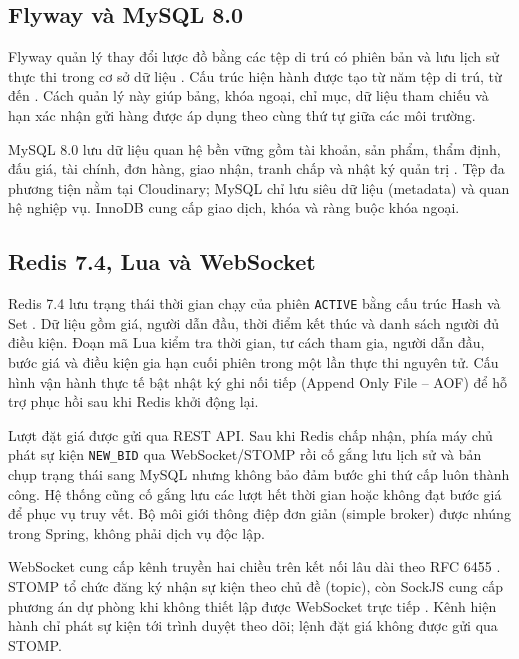 \documentclass[../DoAn.tex]{subfiles}
\begin{document}
\subsection{Flyway và MySQL 8.0}

Flyway quản lý thay đổi lược đồ bằng các tệp di trú có phiên bản và lưu lịch sử thực thi trong cơ sở dữ liệu \cite{flywaydocs}. Cấu trúc hiện hành được tạo từ năm tệp di trú, từ  đến . Cách quản lý này giúp bảng, khóa ngoại, chỉ mục, dữ liệu tham chiếu và hạn xác nhận gửi hàng được áp dụng theo cùng thứ tự giữa các môi trường.

MySQL 8.0 lưu dữ liệu quan hệ bền vững gồm tài khoản, sản phẩm, thẩm định, đấu giá, tài chính, đơn hàng, giao nhận, tranh chấp và nhật ký quản trị \cite{mysqldocs}. Tệp đa phương tiện nằm tại Cloudinary; MySQL chỉ lưu siêu dữ liệu (metadata) và quan hệ nghiệp vụ. InnoDB cung cấp giao dịch, khóa và ràng buộc khóa ngoại.

\subsection{Redis 7.4, Lua và WebSocket}

Redis 7.4 lưu trạng thái thời gian chạy của phiên \texttt{ACTIVE} bằng cấu trúc Hash và Set \cite{redisdocs}. Dữ liệu gồm giá, người dẫn đầu, thời điểm kết thúc và danh sách người đủ điều kiện. Đoạn mã Lua kiểm tra thời gian, tư cách tham gia, người dẫn đầu, bước giá và điều kiện gia hạn cuối phiên trong một lần thực thi nguyên tử. Cấu hình vận hành thực tế bật nhật ký ghi nối tiếp (Append Only File -- AOF) để hỗ trợ phục hồi sau khi Redis khởi động lại.

Lượt đặt giá được gửi qua REST API. Sau khi Redis chấp nhận, phía máy chủ phát sự kiện \texttt{NEW\_BID} qua WebSocket/STOMP rồi cố gắng lưu lịch sử và bản chụp trạng thái sang MySQL nhưng không bảo đảm bước ghi thứ cấp luôn thành công. Hệ thống cũng cố gắng lưu các lượt hết thời gian hoặc không đạt bước giá để phục vụ truy vết. Bộ môi giới thông điệp đơn giản (simple broker) được nhúng trong Spring, không phải dịch vụ độc lập.

WebSocket cung cấp kênh truyền hai chiều trên kết nối lâu dài theo RFC 6455 \cite{rfc6455}. STOMP tổ chức đăng ký nhận sự kiện theo chủ đề (topic), còn SockJS cung cấp phương án dự phòng khi không thiết lập được WebSocket trực tiếp \cite{springwebsocketdocs}. Kênh hiện hành chỉ phát sự kiện tới trình duyệt theo dõi; lệnh đặt giá không được gửi qua STOMP.
\end{document}
